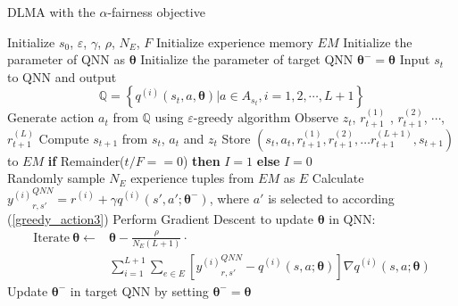 \documentclass[journal,comsoc]{IEEEtran}
\begin{document}
\begin{algorithm}[!t]
	\caption{DLMA with the $ \alpha $-fairness objective}\label{alg:DLMA2}
	\begin{algorithmic}
		\State Initialize $ s_0 $, $ \varepsilon $, $ \gamma $, $ \rho $,  $ N_E $, $ F $
		\State Initialize experience memory $ EM $
		\State Initialize the parameter of QNN as $  \bm{\theta } $ 
		\State Initialize the parameter of target QNN  $ \bm{\theta^- }=\bm{\theta } $ 
		\State Input $ s_t $ to QNN and output  
		\begin{equation*}
		\mathbb{Q} = \left\{ {{q^{\left( i \right)}}\left( {s_t,a,{\bm{\theta }}} \right)|a \in {A_{s_t}}}, i=1,2,\cdots, L+1 \right\}
		\end{equation*}
		\State Generate action $ a_t $ from $ \mathbb{Q} $ using $ \varepsilon $-greedy algorithm
		\State Observe $ z_t $, $ r^{\left( 1 \right)}_{t+1} $ , $ r^{\left( 2 \right)}_{t+1} $, $ \cdots $, $ r^{\left( L \right)}_{t+1} $
		\State Compute $ s_{t+1} $ from $ s_t $, $ a_t $ and $ z_t $
		\State Store $ \left( {s_t,a_t,{r^{\left( 1 \right)}_{t+1}},{r^{\left( 2 \right)}_{t+1}}, \ldots {r^{\left( {L + 1} \right)}_{t+1}},s_{t+1}} \right) $ to  $ EM $
		\State \textbf{if} Remainder($ t/F==0 $) \textbf{then}  $ I=1 $ \textbf{else} $ I=0 $
		\State {}
		\EndFor \\
		\State Randomly sample $ N_E $ experience tuples from $ EM $ as $ E $
		\State Calculate ${y^{\left( i \right)}}_{r,s'}^{QNN} = {r^{\left( i \right)}} + \gamma {q^{\left( i \right)}}\left( {s',a';{{\bm{\theta }}^ - }} \right)$, where $ a' $ is selected to according (\ref{greedy_action3})
		\EndFor 
		\State Perform Gradient Descent to update  $ \bm{\theta } $ in QNN:
		\begin{align*}
		\text{Iterate} \ {\bm{\theta }} \leftarrow &{\bm{\theta }} - \frac{\rho }{{{N_E}\left( {L + 1} \right)}} \cdot \\ &\sum\limits_{i = 1}^{L + 1} {\sum\limits_{e \in E} {\left[ {{y^{\left( i \right)}}_{r,s'}^{QNN} - {q^{\left( i \right)}}\left( {s,a;{\bm{\theta }}} \right)} \right]\nabla {q^{\left( i \right)}}\left( {s,a;{\bm{\theta }}} \right)} } 
		\end{align*}
		\State Update $ \bm{\theta^- } $ in target QNN by setting $ \bm{\theta^-} = \bm{\theta } $
		\EndIf
		\EndProcedure
	\end{algorithmic}
\end{algorithm}
\end{document}
